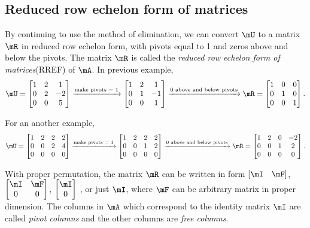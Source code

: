 \documentclass[11pt]{article}
\theoremstyle{plain}
\theoremstyle{definition}
\begin{document}
\subsection{Reduced row echelon form of matrices}
By continuing to use the method of elimination, we can convert $\mU$ to a matrix $\mR$ in reduced row echelon form, with pivots equal to 1 and zeros above and below the pivots. The matrix $\mR$ is called the \textit{reduced row echelon form of matrices}(RREF) of $\mA$. In previous example,
\begin{align}
	\mU = \begin{bmatrix}
		1 &2&1\\0 & 2 & -2\\ 0 & 0 & 5
	\end{bmatrix} \xrightarrow{\text{make pivots = 1}} \begin{bmatrix}
		1 &2&1\\0 & 1 & -1\\ 0 & 0 & 1
	\end{bmatrix} 
	\xrightarrow{\text{0 above and below pivots}} \mR =  \begin{bmatrix}
		1 &0&0\\0 & 1 & 0\\ 0 & 0 & 1
	\end{bmatrix} .
\end{align}

For an another example,
\begin{align}
	\mU = \begin{bmatrix}
		1 &2&2&2\\0 &0 & 2 & 4\\ 0 & 0 & 0&0
	\end{bmatrix} \xrightarrow{\text{make pivots = 1}} \begin{bmatrix}
		1 &2&2&2\\0 &0 & 1 & 2\\ 0 & 0 & 0&0
	\end{bmatrix} 
	\xrightarrow{\text{0 above and below pivots}} \mR =  \begin{bmatrix}
		1 &2&0&-2\\0 &0 & 1 & 2\\ 0 & 0 & 0&0
	\end{bmatrix} .
\end{align}

With proper permutation, the matrix $\mR$ can be written in form $[\mI \quad \mF]$, $\begin{bmatrix} \mI&\mF\\0 &0	\end{bmatrix}$, $\begin{bmatrix} \mI \\0	\end{bmatrix}$ , or just $\mI$, where $\mF$ can be arbitrary matrix in proper dimension. The columns in $\mA$ which correspond to the identity matrix $\mI$ are called \textit{pivot columns} and the other columns are \textit{free columns}.
\end{document}
